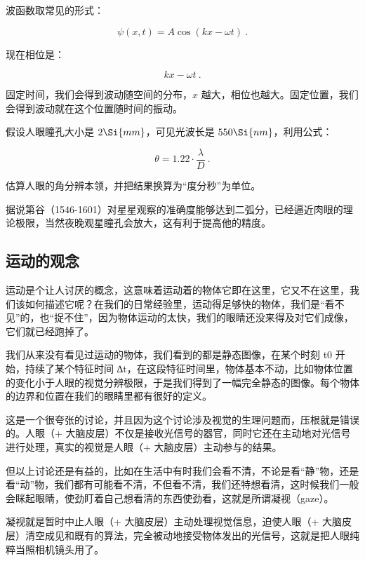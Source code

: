 波函数取常见的形式：

\begin{equation}
\psi (x,t )= A \cos \left( k x - \omega t \right)~.
\end{equation}

现在相位是：

\begin{equation}
k x - \omega t~.
\end{equation}

固定时间，我们会得到波动随空间的分布，$x$ 越大，相位也越大。固定位置，我们会得到波动就在这个位置随时间的振动。

\begin{exercise}{}
假设人眼瞳孔大小是 $2\Si{mm}$，可见光波长是 $550\Si{nm}$，利用公式：

\begin{equation}
\theta = 1.22 \cdot \frac{\lambda}{D}~.
\end{equation}

估算人眼的角分辨本领，并把结果换算为“度分秒”为单位。

据说第谷（1546-1601）对星星观察的准确度能够达到二弧分，已经逼近肉眼的理论极限，当然夜晚观星瞳孔会放大，这有利于提高他的精度。
\end{exercise}

\subsection{运动的观念}
运动是个让⼈讨厌的概念，这意味着运动着的物体它即在这里，它又不在这里，我们该如何描述它呢？在我们的日常经验里，运动得⾜够快的物体，我们是“看不见”的，也“捉不住”，因为物体运动的太快，我们的眼睛还没来得及对它们成像，它们就已经跑掉了。

我们从来没有看见过运动的物体，我们看到的都是静态图像，在某个时刻 t0 开始，持续了某个特征时间 ∆t，在这段特征时间里，物体基本不动，比如物体位置的变化小于⼈眼的视觉分辨极限，于是我们得到了⼀幅完全静态的图像。每个物体的边界和位置在我们的眼睛里都有很好的定义。

这是⼀个很夸张的讨论，并且因为这个讨论涉及视觉的⽣理问题⽽，压根就是错误的。⼈眼（+ ⼤脑皮层）不仅是接收光信号的器官，同时它还在主动地对光信号进⾏处理，真实的视觉是⼈眼（+ ⼤脑皮层）主动参与的结果。

但以上讨论还是有益的，比如在⽣活中有时我们会看不清，不论是看“静”物，还是看“动”物，我们都有可能看不清，不但看不清，我们还特想看清，这时候我们⼀般会眯起眼睛，使劲盯着自⼰想看清的东西使劲看，这就是所谓凝视（gaze）。

凝视就是暂时中⽌⼈眼（+ ⼤脑皮层）主动处理视觉信息，迫使⼈眼（+ ⼤脑皮层）清空成见和既有的算法，完全被动地接受物体发出的光信号，这就是把⼈眼纯粹当照相机镜头用了。

